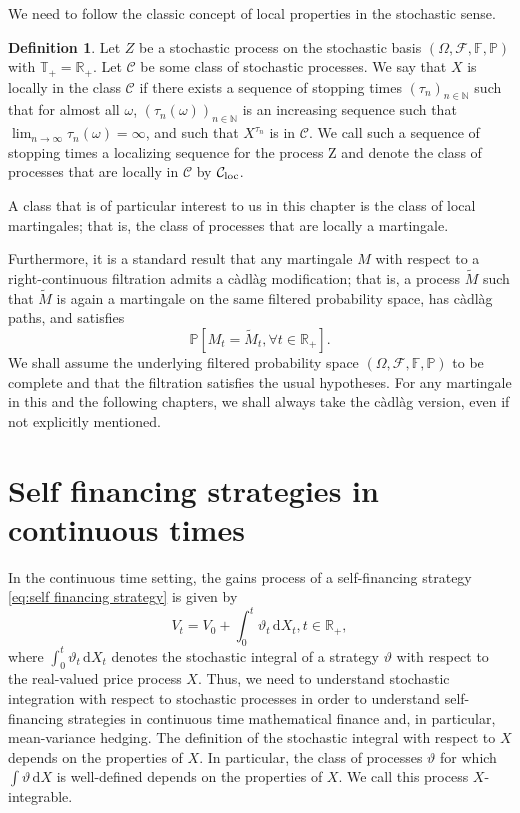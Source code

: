 \documentclass[11pt,a4paper,twoside,openany]{report}
\numberwithin{equation}{section}
\newcommand{\diff}{\mathrm{d}}
\theoremstyle{plain} %
\theoremstyle{definition} %
\newtheorem{definition}[theorem]{Definition}
\theoremstyle{remark} %
\begin{document}
 
We need to follow the classic concept of local properties in the stochastic sense.
\begin{definition}\label{def:local martingale}
    Let \(Z\) be a stochastic process on the stochastic basis \((\Omega,\mathcal{F},\mathbb{F},\mathbb{P})\) with \(\mathbb{T}_+=\mathbb{R}_+\). Let \(\mathcal{C}\) be some class of stochastic  processes. We say that \(X\) is locally in the class \(\mathcal{C}\) if there exists a sequence of stopping times \((\tau_n)_{n\in\mathbb{N}}\) such that for almost all \(\omega\), \((\tau_n(\omega))_{n\in\mathbb{N}}\) is an increasing sequence such that \(\lim_{n\to\infty}\tau_n(\omega)=\infty\), and such that \(X^{\tau_n}\) is in \(\mathcal{C}\). We call such a sequence of stopping times a localizing sequence for the process Z and denote the class of processes that are locally in \(\mathcal{C}\) by \(\mathcal{C}_{\rm{loc}}\). 
\end{definition}
A class that is of particular interest to us in this chapter is the class of local martingales; that is, the class of processes that are locally a martingale. 


Furthermore, it is a standard result that any martingale \(M\) with respect to a right-continuous filtration admits a càdlàg modification; that is, a process \(\widetilde{M}\) such that \(\widetilde{M}\) is again a martingale on the same filtered probability space, has càdlàg paths, and satisfies
\begin{equation*}
    \mathbb{P}[M_t=\widetilde{M}_t,\forall t\in \mathbb{R}_+].
\end{equation*}
We shall assume the underlying filtered probability space \((\Omega,\mathcal{F},\mathbb{F},\mathbb{P})\) to be complete and that the filtration satisfies the usual hypotheses.
For any martingale in this and the following chapters, we shall always take the càdlàg version, even if not explicitly mentioned.
\section{Self financing strategies in continuous times}\label{sec:Self financing strategies in continuous times}
In the continuous time setting, the gains process of a self-financing strategy \eqref{eq:self financing strategy} is given by
\begin{equation*}
    V_t = V_0 + \int_0^t \vartheta_t\,\diff X_t,t\in\mathbb{R}_+,
\end{equation*}
where \(\int_0^t \vartheta_t\,\diff X_t\) denotes the stochastic integral of a strategy \(\vartheta\) with respect to the real-valued price process \(X\). Thus, we need to understand stochastic integration with respect to stochastic processes in order to understand self-financing strategies in continuous time mathematical finance and, in particular, mean-variance hedging. The definition of the stochastic integral with respect to \(X\) depends on the properties of \(X\). In particular, the class of processes \(\vartheta\) for which \(\int\vartheta\,\diff X\) is well-defined depends on the properties of \(X\). We call this process \(X\)-integrable.
\end{document}
